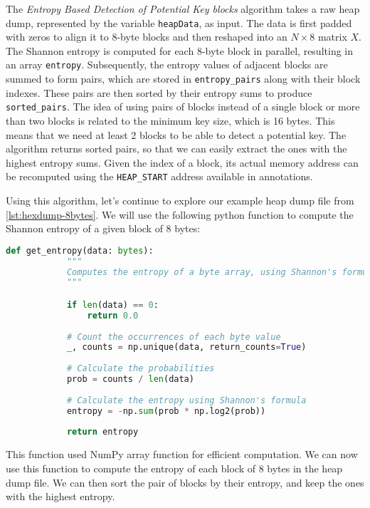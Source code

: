     The \textit{Entropy Based Detection of Potential Key blocks} algorithm takes a raw heap dump, represented by the variable \texttt{heapData}, as input. The data is first padded with zeros to align it to 8-byte blocks and then reshaped into an $N \times 8$ matrix $X$. The Shannon entropy is computed for each 8-byte block in parallel, resulting in an array \texttt{entropy}. Subsequently, the entropy values of adjacent blocks are summed to form pairs, which are stored in \texttt{entropy\_pairs} along with their block indexes. These pairs are then sorted by their entropy sums to produce \texttt{sorted\_pairs}. The idea of using pairs of blocks instead of a single block or more than two blocks is related to the minimum key size, which is 16 bytes. This means that we need at least 2 blocks to be able to detect a potential key. The algorithm returns sorted pairs, so that we can easily extract the ones with the highest entropy sums. Given the index of a block, its actual memory address can be recomputed using the \texttt{HEAP\_START} address available in annotations.
    
    Using this algorithm, let's continue to explore our example heap dump file from \ref{lst:hexdump-8bytes}. We will use the following python function to compute the Shannon entropy of a given block of 8 bytes:

    \begin{minipage}{\dimexpr\linewidth-20pt}
    \begin{lstlisting}[language=python, caption={Python function to compute the Shannon entropy of a given block of 8 bytes}]
        def get_entropy(data: bytes):
            """
            Computes the entropy of a byte array, using Shannon's formula.
            """

            if len(data) == 0:
                return 0.0
            
            # Count the occurrences of each byte value
            _, counts = np.unique(data, return_counts=True)
            
            # Calculate the probabilities
            prob = counts / len(data)
            
            # Calculate the entropy using Shannon's formula
            entropy = -np.sum(prob * np.log2(prob))
            
            return entropy
    \end{lstlisting}
    \end{minipage}

    This function used NumPy array function for efficient computation. We can now use this function to compute the entropy of each block of 8 bytes in the heap dump file. We can then sort the pair of blocks by their entropy, and keep the ones with the highest entropy.
    
